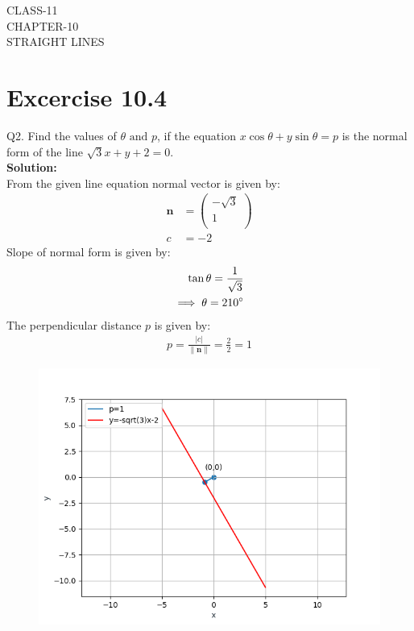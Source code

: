 \documentclass[12pt]{article}
\providecommand{\norm}[1]{\left\lVert#1\right\rVert}
\newcommand{\solution}{\noindent \textbf{Solution: }}
\newcommand{\myvec}[1]{\ensuremath{\begin{pmatrix}#1\end{pmatrix}}}
\let\vec\mathbf
\begin{document}
\begin{center}
\textbf\large{CLASS-11 \\ CHAPTER-10 \\ STRAIGHT LINES}
\end{center}
\section*{Excercise 10.4}

Q2. Find the values of $\theta \text{ and } p$, if the equation $x\cos\theta+y\sin\theta=p$ is the normal form
of the line $\sqrt{3}x+y+2=0$.
\\
\solution
\\
From the given line equation normal vector is given by:
		\begin{align}
	\vec{n}&=\myvec{-\sqrt{3}\\1\\}\\
			c&=-2
		\end{align}
	Slope of normal form is given by:
		\begin{align}
			\tan\theta=\frac{1}{{\sqrt{3}}}\\
		\implies \theta=210\degree
		\end{align}
	The perpendicular distance $p$ is given by:
		\begin{align}
			p=\frac{|c|}{\norm{\vec{n}}}=\frac{2}{2}=1
		\end{align}
\begin{figure}[H]
	\begin{center} 
	    \includegraphics[width=\columnwidth]{figs/line.png}
	\end{center}
\caption{}
\label{fig:Fig1}
\end{figure}
\end{document}
